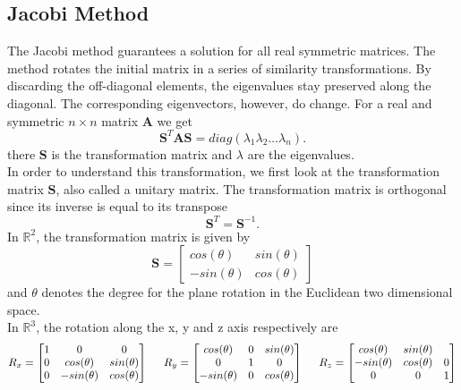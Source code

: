\documentclass[%
oneside,                 %
final,                   %
10pt]{article}
\newcommand{\R}{\mathbb{R}}
\begin{document}
\subsection{Jacobi Method}
The Jacobi method guarantees a solution for all real symmetric matrices. 
The method rotates the initial matrix in a series of similarity transformations. By discarding the off-diagonal elements, the eigenvalues stay preserved along the diagonal. The corresponding eigenvectors, however, do change. For a real and symmetric $n \times n $ matrix $\mathbf{A}$ we get
\begin{equation}
\mathbf{S}^T \mathbf{A} \mathbf{S} = diag(\lambda_1 \lambda_2 \ldots \lambda_n).
\end{equation}
there $\mathbf{S}$ is the transformation matrix and $\lambda$ are the eigenvalues. \\
In order to understand this transformation, we first look at the transformation matrix $\mathbf{S}$, also called a unitary matrix. 
The transformation matrix is orthogonal since its inverse is equal to its transpose
\begin{equation*}
\mathbf{S}^T = \mathbf{S}^{-1}.
\end{equation*}
In $\R^2$, the transformation matrix is given by
\[
     \mathbf{S} = \begin{bmatrix}
     				cos(\theta) & sin(\theta) \\
					-sin(\theta) & cos(\theta)
                      \end{bmatrix}
\]
and $\theta$ denotes the degree for the plane rotation in the Euclidean two dimensional space. \\
In $\R^3$, the rotation along the x, y and z axis respectively are 
\[
    R_x = \begin{bmatrix}
     				1 			&	0 			&0				\\
     				0			&	cos(\theta) & sin(\theta) \\
					0			&	-sin(\theta) & cos(\theta)
                      \end{bmatrix}
	\hspace{0.5cm} R_y = \begin{bmatrix}
     				cos(\theta)&	0 			& sin(\theta)		\\
     				0			&	1 			& 0 				\\
					-sin(\theta)	&	0			& cos(\theta)
                      \end{bmatrix}
	\hspace{0.5cm} R_z = \begin{bmatrix}
     				cos(\theta)& sin(\theta)	& 	\\
     				-sin(\theta)	& cos(\theta) 	& 0 \\
						0		&	0			& 1
                      \end{bmatrix}
\]
\end{document}

